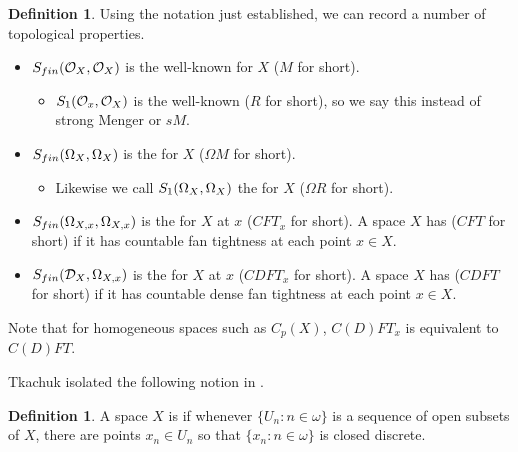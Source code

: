 \documentclass{amsart}
\theoremstyle{plain}
\theoremstyle{definition}
\newtheorem{definition}[theorem]{Definition}
\theoremstyle{remark}
\theoremstyle{plain}
\theoremstyle{definition}
\theoremstyle{remark}
\begin{document}
\begin{definition}\label{SelectionPrinciples}
 Using the notation just established, we can record a number of topological properties.
  \begin{itemize}
   \item \(S_{fin}(\mathcal{O}_X,\mathcal{O}_X)\) is the well-known  for \(X\) (\(M\) for short).
     \begin{itemize}
       \item \(S_{1}(\mathcal{O}_x,\mathcal{O}_X)\) is the well-known 
       (\(R\) for short), so we say this instead of strong Menger or \(sM\).
     \end{itemize}
   \item \(S_{fin}(\Omega_X,\Omega_X)\) is the  for \(X\) (\(\Omega M\) for short).
     \begin{itemize}
       \item Likewise we call \(S_{1}(\Omega_X,\Omega_X)\) the 
        for \(X\) (\(\Omega R\) for short). 
     \end{itemize}
   \item \(S_{fin}(\Omega_{X,x},\Omega_{X,x})\) is the  for \(X\) at \(x\) (\(CFT_x\) for short). A space \(X\) has  (\(CFT\) for short)
    if it has countable fan tightness at each point \(x\in X\).
   \item \(S_{fin}(\mathcal{D}_X,\Omega_{X,x})\) is the  for \(X\) at \(x\) (\(CDFT_x\) for short). A space \(X\) has  (\(CDFT\) for short) if it has countable dense fan tightness at each point \(x\in X\).
  \end{itemize}
\end{definition}

Note that for homogeneous spaces such as \(C_p(X)\), \(C(D)FT_x\) is equivalent to \(C(D)FT\).

Tkachuk isolated the following notion in \cite{Tkachuk2}.

\begin{definition}
 A space \(X\) is  if whenever \(\{U_n : n \in \omega\}\) is a sequence of open subsets of \(X\), there are points \(x_n \in U_n\) so that \(\{x_n : n \in \omega\}\) is closed discrete.
\end{definition}
\end{document}
